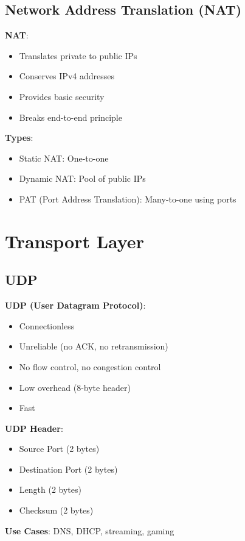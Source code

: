 \documentclass[12pt,a4paper]{report}
\begin{document}
\subsection{Network Address Translation (NAT)}
\begin{concept}
\textbf{NAT}:
\begin{itemize}
    \item Translates private to public IPs
    \item Conserves IPv4 addresses
    \item Provides basic security
    \item Breaks end-to-end principle
\end{itemize}

\textbf{Types}:
\begin{itemize}
    \item Static NAT: One-to-one
    \item Dynamic NAT: Pool of public IPs
    \item PAT (Port Address Translation): Many-to-one using ports
\end{itemize}
\end{concept}

\section{Transport Layer}

\subsection{UDP}
\begin{concept}
\textbf{UDP (User Datagram Protocol)}:
\begin{itemize}
    \item Connectionless
    \item Unreliable (no ACK, no retransmission)
    \item No flow control, no congestion control
    \item Low overhead (8-byte header)
    \item Fast
\end{itemize}

\textbf{UDP Header}:
\begin{itemize}
    \item Source Port (2 bytes)
    \item Destination Port (2 bytes)
    \item Length (2 bytes)
    \item Checksum (2 bytes)
\end{itemize}

\textbf{Use Cases}: DNS, DHCP, streaming, gaming
\end{concept}
\end{document}
